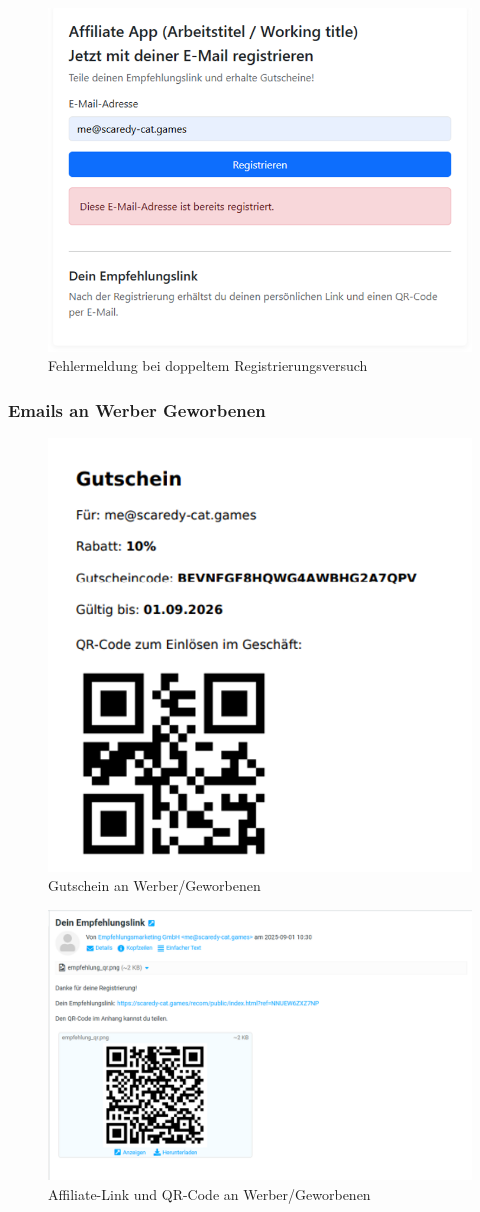 \begin{figure}[H]
    \centering
    \includegraphics[width=0.8\linewidth]{Bilder/screenshots/form_already_registered.png}
    \caption{Fehlermeldung bei doppeltem Registrierungsversuch}
    \label{fig:placeholder}
\end{figure}

\subsubsection{Emails an Werber \bzw Geworbenen}
\begin{figure}[H]
    \centering
    \includegraphics[width=0.5\linewidth]{Bilder/screenshots/email_voucher.png}
    \caption{Gutschein an Werber/Geworbenen}
    \label{fig:placeholder}
\end{figure}

\begin{figure}[H]
    \centering
    \includegraphics[width=1.0\linewidth]{Bilder/screenshots/mail_affiliate_link.png}
    \caption{Affiliate-Link und QR-Code an Werber/Geworbenen}
    \label{fig:placeholder}
\end{figure}